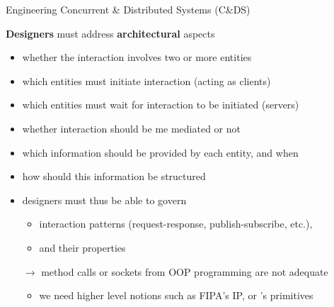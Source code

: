 \documentclass[presentation]{beamer}\mode<presentation>{\usetheme{AMSCesenaPurpleAndGold}}
\begin{document}
\begin{frame}[c,allowframebreaks]{Engineering Concurrent \& Distributed Systems (C\&DS)}
	\begin{block}{\textbf{Designers} must address \textbf{architectural} aspects}
		\begin{itemize}
			\item whether the interaction involves \alert{two or more} entities
			\item which entities must \alert{initiate} interaction (acting as clients)
			\item which entities must \alert{wait} for interaction to be initiated (servers)
			\item whether interaction should be me \alert{mediated} or not
			\item which information should be provided by each entity, and \alert{when}
			\item how should this information be \alert{structured}
		\end{itemize}
	\end{block}

	\bigskip

	\begin{itemize}
		\item designers must thus be able to govern
		\begin{itemize}
			\item interaction patterns (request-response, publish-subscribe, etc.),
			\item and their properties
		\end{itemize}

		\bigskip

		\item[$\rightarrow$] method calls or sockets from OOP programming are not adequate
		\begin{itemize}
			\item we need higher level notions such as \alert{FIPA's IP}, or \alert{\linda{}'s primitives}
		\end{itemize}
	\end{itemize}

	\framebreak


\end{frame}
\end{document}

